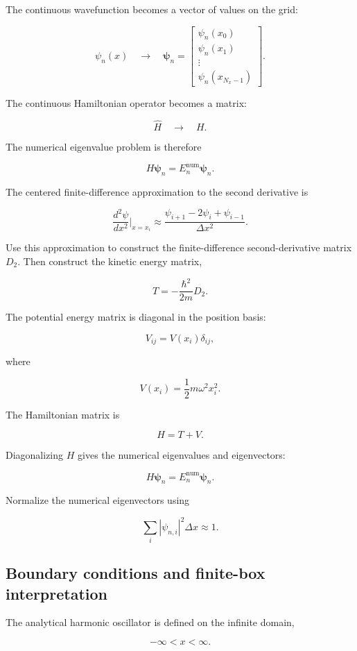 The continuous wavefunction becomes a vector of values on the grid:

\[
\psi_n(x)
\quad\longrightarrow\quad
\boldsymbol{\psi}_n
=
\begin{bmatrix}
\psi_n(x_0)\\
\psi_n(x_1)\\
\vdots\\
\psi_n(x_{N_x-1})
\end{bmatrix}.
\]

The continuous Hamiltonian operator becomes a matrix:

\[
\hat{H}
\quad\longrightarrow\quad
H.
\]

The numerical eigenvalue problem is therefore

\[
H\boldsymbol{\psi}_n
=
E_n^{\mathrm{num}}
\boldsymbol{\psi}_n.
\]

The centered finite-difference approximation to the second derivative is

\[
\frac{d^2\psi}{dx^2}
\bigg|_{x=x_i}
\approx
\frac{
\psi_{i+1}-2\psi_i+\psi_{i-1}
}{\Delta x^2}.
\]

Use this approximation to construct the finite-difference second-derivative matrix \(D_2\). Then construct the kinetic energy matrix,

\[
T
=
-\frac{\hbar^2}{2m}D_2.
\]

The potential energy matrix is diagonal in the position basis:

\[
V_{ij}
=
V(x_i)\delta_{ij},
\]

where

\[
V(x_i)
=
\frac{1}{2}m\omega^2x_i^2.
\]

The Hamiltonian matrix is

\[
H
=
T+V.
\]

Diagonalizing \(H\) gives the numerical eigenvalues and eigenvectors:

\[
H\boldsymbol{\psi}_n
=
E_n^{\mathrm{num}}\boldsymbol{\psi}_n.
\]

Normalize the numerical eigenvectors using

\[
\sum_i |\psi_{n,i}|^2\Delta x
\approx
1.
\]

\subsection{Boundary conditions and finite-box interpretation}

The analytical harmonic oscillator is defined on the infinite domain,

\[
-\infty < x < \infty.
\]

